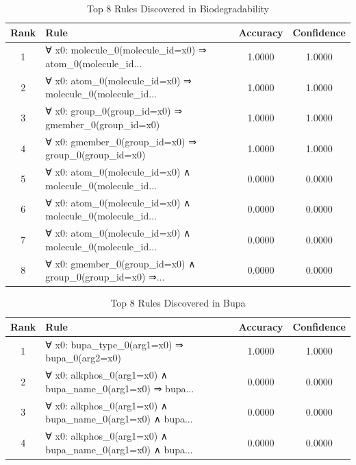 \documentclass[11pt,a4paper]{article}
\begin{document}
\begin{table}[h!]
\centering
\small
\caption{Top 8 Rules Discovered in Biodegradability}
\label{tab:rules_Biodegradability}
\begin{tabular}{|c|p{5cm}|c|c|}
\hline
\textbf{Rank} & \textbf{Rule} & \textbf{Accuracy} & \textbf{Confidence} \\
\hline
1 & ∀ x0: molecule\_0(molecule\_id=x0) ⇒ atom\_0(molecule\_id... & 1.0000 & 1.0000 \\
2 & ∀ x0: atom\_0(molecule\_id=x0) ⇒ molecule\_0(molecule\_id... & 1.0000 & 1.0000 \\
3 & ∀ x0: group\_0(group\_id=x0) ⇒ gmember\_0(group\_id=x0) & 1.0000 & 1.0000 \\
4 & ∀ x0: gmember\_0(group\_id=x0) ⇒ group\_0(group\_id=x0) & 1.0000 & 1.0000 \\
5 & ∀ x0: atom\_0(molecule\_id=x0) ∧ molecule\_0(molecule\_id... & 0.0000 & 0.0000 \\
6 & ∀ x0: atom\_0(molecule\_id=x0) ∧ molecule\_0(molecule\_id... & 0.0000 & 0.0000 \\
7 & ∀ x0: atom\_0(molecule\_id=x0) ∧ molecule\_0(molecule\_id... & 0.0000 & 0.0000 \\
8 & ∀ x0: gmember\_0(group\_id=x0) ∧ group\_0(group\_id=x0) ⇒... & 0.0000 & 0.0000 \\
\hline
\end{tabular}
\end{table}

\begin{table}[h!]
\centering
\small
\caption{Top 8 Rules Discovered in Bupa}
\label{tab:rules_Bupa}
\begin{tabular}{|c|p{5cm}|c|c|}
\hline
\textbf{Rank} & \textbf{Rule} & \textbf{Accuracy} & \textbf{Confidence} \\
\hline
1 & ∀ x0: bupa\_type\_0(arg1=x0) ⇒ bupa\_0(arg2=x0) & 1.0000 & 1.0000 \\
2 & ∀ x0: alkphos\_0(arg1=x0) ∧ bupa\_name\_0(arg1=x0) ⇒ bupa... & 0.0000 & 0.0000 \\
3 & ∀ x0: alkphos\_0(arg1=x0) ∧ bupa\_name\_0(arg1=x0) ∧ bupa... & 0.0000 & 0.0000 \\
4 & ∀ x0: alkphos\_0(arg1=x0) ∧ bupa\_name\_0(arg1=x0) ∧ bupa... & 0.0000 & 0.0000 \\
\hline
\end{tabular}
\end{table}
\end{document}
